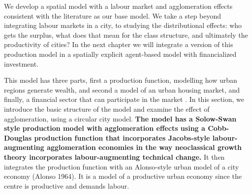 We develop a spatial model with a labour market and agglomeration effects consistent with the literature as our base model. 
We take a step beyond integrating labour markets in a city, to studying the distributional effects: who gets the surplus, what does that mean for the class structure, and ultimately the productivity of cities? 
In the next chapter we will integrate a version of this production model in a spatially explicit agent-based model with financialized investment. 

This model has three  parts, first a production function, modelling how urban regions generate wealth, and second a model of an urban housing market, and finally, a financial sector that can participate in the market . 
In this section, we introduce the basic structure of the model and examine the effect of agglomeration, using a circular city model.  
\textbf{The model has a Solow-Swan style production model with agglomeration effects using a Cobb-Douglas production function that incorporates Jacobs-style labour-augmenting agglomeration economies %
in the way neoclassical growth theory incorporates labour-augmenting technical change.}
It then integrates the production function with an Alonso-style urban model of a city economy (Alonso 1964). 
It is a model of a productive urban economy since the centre is productive and demands labour.


